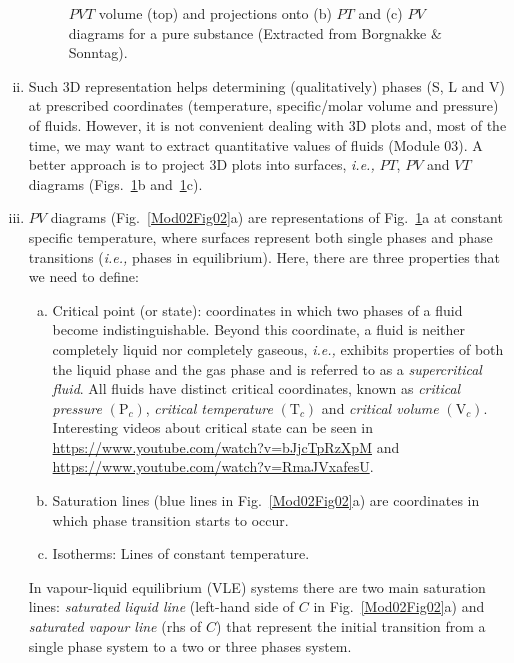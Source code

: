 \documentclass[12pts,a4paper,amsmath,amssymb,floatfix]{article}%
\newcommand{\ie}{{\it i.e., }}
\begin{document}
\begin{enumerate}[i)]
\begin{figure}[h]
\begin{center}
                 \caption{$PVT$ volume (top) and projections onto (b) $PT$ and (c) $PV$ diagrams for a pure substance (Extracted from Borgnakke $\&$ Sonntag).}\label{Mod02Fig01}
              \end{center}
           \end{figure}    
%
       \item Such 3D representation helps determining (qualitatively) phases (S, L and V) at prescribed coordinates (temperature, specific/molar volume and pressure) of fluids. However, it is not convenient dealing with 3D plots and, most of the time, we may want to extract quantitative values of fluids (Module 03). A better approach is to project 3D plots into surfaces, \ie $PT$, $PV$ and $VT$ diagrams (Figs.~\ref{Mod02Fig01}b and~\ref{Mod02Fig01}c).
%
       \item $PV$ diagrams (Fig.~\ref{Mod02Fig02}a) are representations of Fig.~\ref{Mod02Fig01}a at constant specific temperature, where surfaces represent both single phases and phase transitions (\ie phases in equilibrium). Here, there are three properties that we need to define:
           \begin{enumerate}[a)]
              \item Critical point (or state): coordinates in which two phases of a fluid become indistinguishable. Beyond this coordinate, a fluid is neither completely liquid nor completely gaseous, \ie exhibits properties of both the liquid phase and the gas phase and is referred to as a {\it supercritical fluid}. All fluids have distinct critical coordinates, known as {\it critical pressure} $\left(\text{P}_{c}\right)$, {\it critical temperature} $\left(\text{T}_{c}\right)$ and {\it critical volume} $\left(\text{V}_{c}\right)$. Interesting videos about critical state can be seen in \href{https://www.youtube.com/watch?v=bJjcTpRzXpM}{https://www.youtube.com/watch?v=bJjcTpRzXpM} and \href{https://www.youtube.com/watch?v=RmaJVxafesU}{https://www.youtube.com/watch?v=RmaJVxafesU}.
              \item Saturation lines (blue lines in Fig.~\ref{Mod02Fig02}a) are coordinates in which phase transition starts to occur.
              \item Isotherms: Lines of constant temperature.
           \end{enumerate} 
           In vapour-liquid equilibrium (VLE) systems there are two main saturation lines: {\it saturated liquid line} (left-hand side of $C$ in Fig.~\ref{Mod02Fig02}a)  and {\it saturated vapour line} (rhs of $C$) that represent the initial transition from a single phase system to a two or three phases system. 

\end{enumerate}
\end{document}
